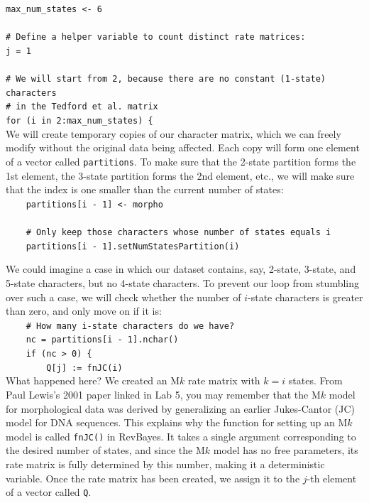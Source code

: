 \documentclass[12pt]{article}
\begin{document}
\indent \texttt{max\_num\_states <- 6} \\
\ \\
\indent \texttt{\# Define a helper variable to count distinct rate matrices:} \\
\indent \texttt{j = 1} \\
\ \\
\indent \texttt{\# We will start from 2, because there are no constant (1-state) characters} \\
\indent \texttt{\# in the Tedford et al. matrix} \\
\indent \texttt{for (i in 2:max\_num\_states) \{} \\

\noindent We will create temporary copies of our character matrix, which we can freely modify without the original data being affected. Each copy will form one element of a vector called \texttt{partitions}. To make sure that the 2-state partition forms the 1st element, the 3-state partition forms the 2nd element, etc., we will make sure that the index is one smaller than the current number of states: \\

\indent \texttt{\ \ \ \ partitions[i - 1] <- morpho} \\
\indent \texttt{\ \ \ \ } \\
\indent \texttt{\ \ \ \ \# Only keep those characters whose number of states equals i} \\
\indent \texttt{\ \ \ \ partitions[i - 1].setNumStatesPartition(i)}

\newpage

\noindent We could imagine a case in which our dataset contains, say, 2-state, 3-state, and 5-state characters, but no 4-state characters. To prevent our loop from stumbling over such a case, we will check whether the number of $i$-state characters is greater than zero, and only move on if it is: \\

\indent \texttt{\ \ \ \ \# How many i-state characters do we have?} \\
\indent \texttt{\ \ \ \ nc = partitions[i - 1].nchar()}
\indent \texttt{\ \ \ \ } \\
\indent \texttt{\ \ \ \ if (nc > 0) \{} \\
\indent \texttt{\ \ \ \ \ \ \ \ Q[j] := fnJC(i)} \\

\noindent What happened here? We created an M$k$ rate matrix with $k = i$ states. From Paul Lewis's 2001 paper linked in Lab 5, you may remember that the M$k$ model for morphological data was derived by generalizing an earlier Jukes-Cantor (JC) model for DNA sequences. This explains why the function for setting up an M$k$ model is called \texttt{fnJC()} in RevBayes. It takes a single argument corresponding to the desired number of states, and since the M$k$ model has no free parameters, its rate matrix is fully determined by this number, making it a deterministic variable. Once the rate matrix has been created, we assign it to the $j$-th element of a vector called \texttt{Q}. \\
\end{document}
